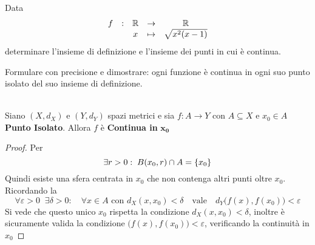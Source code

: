 \begin{exercise}
	Data
	\[\begin{array}{ccccc} {f} & : & {\mathbb{R}} & \to & {\mathbb{R}} \\ & & {x} & \mapsto & {\sqrt{x^2(x-1)}} \\ \end{array}\]
	determinare l'insieme di definizione e l'insieme dei punti in cui è continua.
\end{exercise}
\begin{exercise}
	\label{ex:f_cont_in_pto_isol}
	Formulare con precisione e dimostrare: ogni funzione è continua in ogni suo punto isolato del suo insieme di definizione.
	\begin{solution}\hfill\\
		\renewcommand\qedsymbol{$\square$} %
		Siano $(X,d_X)$ e $(Y,d_Y)$ spazi metrici e sia $f: A \to Y$ con $A \subseteq X$ e $x_0 \in A$ \textbf{Punto Isolato}. Allora $f$ è \textbf{Continua in} $\boldsymbol{x_0}$
		\begin{proof}
			\let\qed\relax %
			Per 
			\[\exists r > 0:\; B(x_0, r) \cap A = \left\{x_0\right\}\]
			Quindi esiste una sfera centrata in $x_0$ che non contenga altri punti oltre $x_0$.
			Ricordando la 
			\[\forall \varepsilon > 0\;\;\exists \delta > 0:\quad \forall x \in A \text{ con } d_X(x,x_0)<\delta \quad \text{vale} \quad d_Y \bigl(f(x),f(x_0)\bigr) < \varepsilon\]
			Si vede che questo unico $x_0$ rispetta la condizione $d_X(x,x_0)<\delta$, inoltre è sicuramente valida la condizione $\bigl(f(x),f(x_0)\bigr) < \varepsilon$, verificando la continuità in $x_0$
		\end{proof}
	\end{solution}
\end{exercise}

